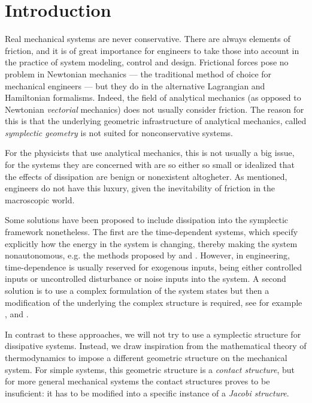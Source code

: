 \chapter{Introduction}
\label{chap:intro}

Real mechanical systems are never conservative. There are always elements of friction, and it is of great importance for engineers to take those into account in the practice of system modeling, control and design. Frictional forces pose no problem in Newtonian mechanics --- the traditional method of choice for mechanical engineers --- but they do in the alternative Lagrangian and Hamiltonian formalisms. Indeed, the field of analytical mechanics (as opposed to Newtonian \emph{vectorial} mechanics) does not usually consider friction. The reason for this is that the underlying geometric infrastructure of analytical mechanics, called \emph{symplectic geometry} is not suited for nonconservative systems.

For the physicists that use analytical mechanics, this is not usually a big issue, for the systems they are concerned with are so either so small or idealized that the effects of dissipation are benign or nonexistent altogheter. As mentioned, engineers do not have this luxury, given the inevitability of friction in the macroscopic world.

Some solutions have been proposed to include dissipation into the symplectic framework nonetheless. The first are the time-dependent systems, which specify explicitly how the energy in the system is changing, thereby making the system nonautonomous, e.g. the methods proposed by \citet{Caldirola1941} and \citet{Kanai1948}. However, in engineering, time-dependence is usually reserved for exogenous inputs, being either controlled inputs or uncontrolled disturbance or noise inputs into the system. A second solution is to use a complex formulation of the system states but then a modification of the underlying the complex structure is required, see for example \citet{Hutters2020}, \citet{Dedene1980} and \citet{Rajeev2007}.

In contrast to these approaches, we will not try to use a symplectic structure for dissipative systems. Instead, we draw inspiration from the mathematical theory of thermodynamics to impose a different geometric structure on the mechanical system. For simple systems, this geometric structure is a \emph{contact structure}, but for more general mechanical systems the contact structures proves to be insuficient: it has to be modified into a specific instance of a \emph{Jacobi structure}.

